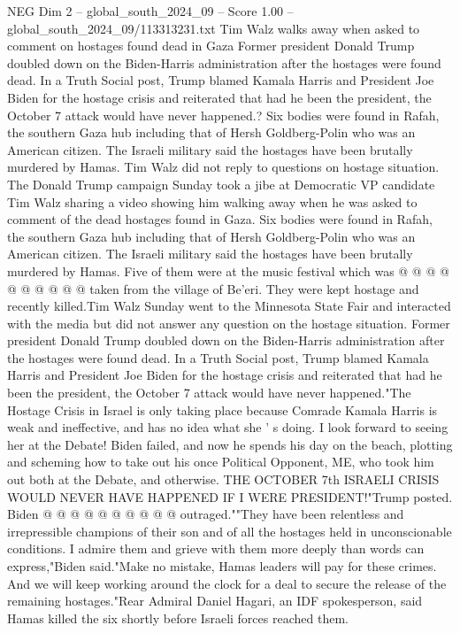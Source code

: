 \begin{textsample}{NEG Dim 2 – global\_south\_2024\_09 – Score 1.00 – global\_south\_2024\_09/113313231.txt}  \label{ex:f2_neg_404}
Tim Walz walks away when asked to comment on hostages found dead in Gaza Former president Donald Trump doubled down on the Biden-Harris administration after the hostages were found dead.
In a Truth Social post, Trump blamed Kamala Harris and President Joe Biden for the hostage crisis and reiterated that had he been the president, the October 7 attack would have never happened.?
Six bodies were found in Rafah, the southern Gaza hub including that of Hersh Goldberg-Polin who was an American citizen.
The Israeli military said the hostages have been brutally murdered by Hamas.
Tim Walz did not reply to questions on hostage situation.
The Donald Trump campaign Sunday took a jibe at Democratic VP candidate Tim Walz sharing a video showing him walking away when he was asked to comment of the dead hostages found in Gaza.
Six bodies were found in Rafah, the southern Gaza hub including that of Hersh Goldberg-Polin who was an American citizen.
The Israeli military said the hostages have been brutally murdered by Hamas.
Five of them were at the music festival which was @ @ @ @ @ @ @ @ @ @ taken from the village of Be'eri.
They were kept hostage and recently killed.Tim Walz Sunday went to the Minnesota State Fair and interacted with the media but did not answer any question on the hostage situation.
Former president Donald Trump doubled down on the Biden-Harris administration after the hostages were found dead.
In a Truth Social post, Trump blamed Kamala Harris and President Joe Biden for the hostage crisis and reiterated that had he been the president, the October 7 attack would have never happened."The Hostage Crisis in Israel is only taking place because Comrade Kamala Harris is weak and ineffective, and has no idea what she ' s doing.
I look forward to seeing her at the Debate!
Biden failed, and now he spends his day on the beach, plotting and scheming how to take out his once Political Opponent, ME, who took him out both at the Debate, and otherwise.
THE OCTOBER 7th ISRAELI CRISIS WOULD NEVER HAVE HAPPENED IF I WERE PRESIDENT!"Trump posted.
Biden @ @ @ @ @ @ @ @ @ @ outraged.""They have been relentless and irrepressible champions of their son and of all the hostages held in unconscionable conditions.
I admire them and grieve with them more deeply than words can express,"Biden said."Make no mistake, Hamas leaders will pay for these crimes.
And we will keep working around the clock for a deal to secure the release of the remaining hostages."Rear Admiral Daniel Hagari, an IDF spokesperson, said Hamas killed the six shortly before Israeli forces reached them.

\end{textsample}
